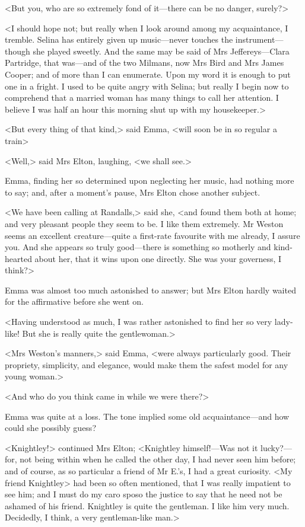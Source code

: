 <But you, who are so extremely fond of it—there can be no danger, surely?>

<I should hope not; but really when I look around among my acquaintance, I tremble. Selina has entirely given up music—never touches the instrument—though she played sweetly. And the same may be said of Mrs Jeffereys—Clara Partridge, that was—and of the two Milmans, now Mrs Bird and Mrs James Cooper; and of more than I can enumerate. Upon my word it is enough to put one in a fright. I used to be quite angry with Selina; but really I begin now to comprehend that a married woman has many things to call her attention. I believe I was half an hour this morning shut up with my housekeeper.>

<But every thing of that kind,> said Emma, <will soon be in so regular a train\longdash>

<Well,> said Mrs Elton, laughing, <we shall see.>

Emma, finding her so determined upon neglecting her music, had nothing more to say; and, after a moment's pause, Mrs Elton chose another subject.

<We have been calling at Randalls,> said she, <and found them both at home; and very pleasant people they seem to be. I like them extremely. Mr Weston seems an excellent creature—quite a first-rate favourite with me already, I assure you. And she appears so truly good—there is something so motherly and kind-hearted about her, that it wins upon one directly. She was your governess, I think?>

Emma was almost too much astonished to answer; but Mrs Elton hardly waited for the affirmative before she went on.

<Having understood as much, I was rather astonished to find her so very lady-like! But she is really quite the gentlewoman.>

<Mrs Weston's manners,> said Emma, <were always particularly good. Their propriety, simplicity, and elegance, would make them the safest model for any young woman.>

<And who do you think came in while we were there?>

Emma was quite at a loss. The tone implied some old acquaintance—and how could she possibly guess?

<Knightley!> continued Mrs Elton; <Knightley himself!—Was not it lucky?—for, not being within when he called the other day, I had never seen him before; and of course, as so particular a friend of Mr E.'s, I had a great curiosity. <My friend Knightley> had been so often mentioned, that I was really impatient to see him; and I must do my caro sposo the justice to say that he need not be ashamed of his friend. Knightley is quite the gentleman. I like him very much. Decidedly, I think, a very gentleman-like man.>

